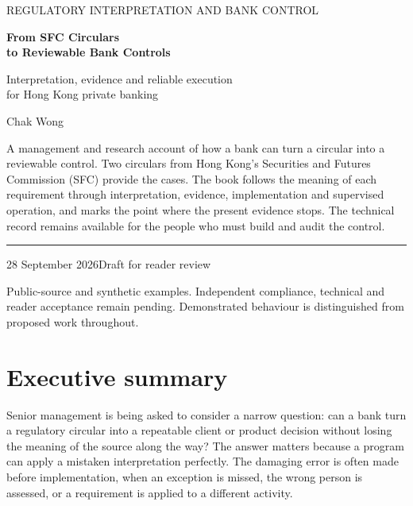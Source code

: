 \documentclass[12pt,a4paper,oneside,openany]{book}
\begin{document}
\raggedbottom
\frontmatter
\hypersetup{pageanchor=false}
\begin{titlepage}
\vspace*{15mm}
{\sffamily\color{teal}\large REGULATORY INTERPRETATION AND BANK CONTROL\par}
\vspace{12mm}
{\sffamily\bfseries\color{navy}\fontsize{32}{37}\selectfont From SFC Circulars\\to Reviewable Bank Controls\par}
\vspace{12mm}
{\Large Interpretation, evidence and reliable execution\\for Hong Kong private banking\par}
\vspace{12mm}
{\large Chak Wong\par}
\vfill
\begin{minipage}{0.94\textwidth}
A management and research account of how a bank can turn a circular into a
reviewable control. Two circulars from Hong Kong's Securities and Futures
Commission (SFC) provide the cases. The book follows the
meaning of each requirement through interpretation, evidence, implementation
and supervised operation, and marks the point where the present evidence stops.
The technical record remains available for the people who must build and audit
the control.
\end{minipage}
\vspace{16mm}
\hrule
\vspace{5mm}
28 September 2026\hfill Draft for reader review\par
\small Public-source and synthetic examples. Independent compliance, technical
and reader acceptance remain pending. Demonstrated behaviour is distinguished
from proposed work throughout.
\end{titlepage}
\hypersetup{pageanchor=true}
\chapter*{Executive summary}
Senior management is being asked to consider a narrow question: can a bank turn
a regulatory circular into a repeatable client or product decision without
losing the meaning of the source along the way? The answer matters because a
program can apply a mistaken interpretation perfectly. The damaging error is
often made before implementation, when an exception is missed, the wrong person
is assessed, or a requirement is applied to a different activity.
\end{document}
